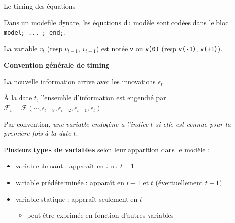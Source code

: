 \documentclass[
  ignorenonframetext,
]{beamer}
\providecommand{\tightlist}{%
  \setlength{\itemsep}{0pt}\setlength{\parskip}{0pt}}
\begin{document}
\begin{frame}[fragile]{Le timing des équations}
\label{le-timing-des-uxe9quations}
\begin{tcolorbox}[enhanced jigsaw, leftrule=.75mm, opacitybacktitle=0.6, rightrule=.15mm, colback=white, coltitle=black, bottomtitle=1mm, colbacktitle=quarto-callout-tip-color!10!white, title=\textcolor{quarto-callout-tip-color}{\faLightbulb}\hspace{0.5em}{Tip}, colframe=quarto-callout-tip-color-frame, arc=.35mm, left=2mm, toprule=.15mm, titlerule=0mm, breakable, toptitle=1mm, opacityback=0, bottomrule=.15mm]

Dans un modefile dynare, les équations du modèle sont codées dans le
bloc \texttt{model;\ ...\ ;\ end;}.

La variable \(v_t\) (resp \(v_{t-1}\), \(v_{t+1}\)) est notée \texttt{v}
ou \texttt{v(0)} (resp \texttt{v(-1)}, \texttt{v(+1)}).

\end{tcolorbox}

\textbf{Convention générale de timing}

La nouvelle information arrive avec les innovations \(\epsilon_t\).

À la date \(t\), l'ensemble d'information est engendré par
\(\mathcal{F}_t = \mathcal{F} (\cdots, \epsilon_{t-3}, \epsilon_{t-2}, \epsilon_{t-1}, \epsilon_t)\)

Par convention, \emph{une variable endogène a l'indice \(t\) si elle est
connue pour la première fois à la date \(t\)}.

\pause

Plusieurs \textbf{types de variables} selon leur apparition dans le
modèle :

\begin{itemize}
\tightlist
\item
  variable de saut : apparaît en \(t\) ou \(t+1\)
\item
  variable prédéterminée : apparaît en \(t-1\) et \(t\) (éventuellement
  \(t+1\))
\item
  variable statique : apparaît seulement en \(t\)

  \begin{itemize}
  \tightlist
  \item
    peut être exprimée en fonction d'autres variables
  \end{itemize}
\end{itemize}
\end{frame}
\end{document}
